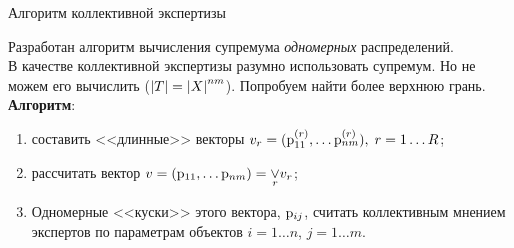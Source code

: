 \begin{frame}{Алгоритм коллективной экспертизы}
 \begin{center}

	Разработан алгоритм вычисления супремума {\em одномерных} распределений. 
	\hspace{-3mm}  %
	\\[2ex] В качестве коллективной экспертизы разумно использовать супремум. Но не можем его вычислить ($\left| T \right| = \left| X \right|^{nm}$). Попробуем найти более верхнюю грань.
	\\[2ex] \textbf{Алгоритм}: 
	\vspace{-3mm}
	\begin{enumerate}
		\item составить <<длинные>> векторы $v_r = ({\mathrm{p}}_{11}^{(r)}, \ldots {\mathrm{p}}_{nm}^{(r)}),\; r = 1 \ldots R$;
		\item рассчитать вектор $v = ({\mathrm{p}}_{11}, \ldots {\mathrm{p}}_{nm}) = \underset{r} \vee  v_r$; 
		\item Одномерные <<куски>> этого вектора, ${\mathrm{p}}_{ij}$,  считать коллективным мнением экспертов по параметрам объектов {\footnotesize $i = 1 \ldots n$, $j = 1 \ldots m$}. 
	\end{enumerate}	
 \end{center}
\end{frame} %

